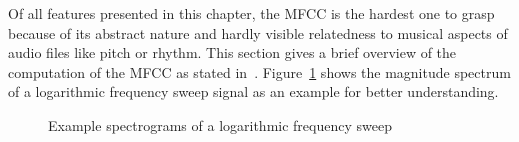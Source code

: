 Of all features presented in this chapter, the MFCC is the hardest one to grasp because of its abstract nature and hardly visible relatedness to musical aspects of audio files like pitch or rhythm. This section gives a brief overview of the computation of the MFCC as stated in~\cite[pp. 55ff]{knees1}.
Figure~\ref{sweep} shows the magnitude spectrum of a logarithmic frequency sweep signal as an example for better understanding.
\begin{figure}[htbp]
	\centering
	\caption{Example spectrograms of a logarithmic frequency sweep}	
	\label{sweep}
\end{figure}
